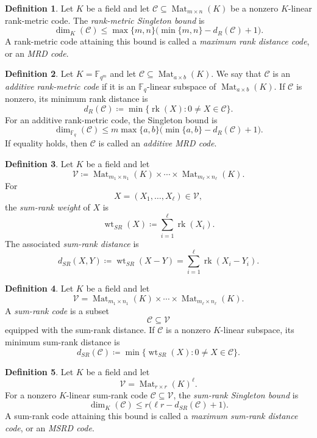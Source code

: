 \documentclass[10pt,a4paper]{amsart}
\DeclareMathOperator{\Mat}{Mat}
\DeclareMathOperator{\rk}{rk}
\DeclareMathOperator{\wt}{wt}
\theoremstyle{definition}
\newtheorem{definition}{Definition}[section]
\theoremstyle{plain}
\theoremstyle{remark}
\newcommand{\vF}{\mathbb F}
\begin{document}
\begin{definition}
Let $K$ be a field and let $\mathcal C\subseteq \Mat_{m\times n}(K)$ be a nonzero $K$-linear rank-metric code. The \emph{rank-metric Singleton bound} is
$$
\dim_K(\mathcal C)\leq \max\{m,n\}\bigl(\min\{m,n\}-d_R(\mathcal C)+1\bigr).
$$
A rank-metric code attaining this bound is called a \emph{maximum rank distance code}, or an \emph{MRD code}.
\end{definition}

\begin{definition}
Let $K=\vF_{q^m}$ and let $\mathcal C\subseteq \Mat_{a\times b}(K)$. We say that $\mathcal C$ is an \emph{additive rank-metric code} if it is an $\vF_q$-linear subspace of $\Mat_{a\times b}(K)$. If $\mathcal C$ is nonzero, its minimum rank distance is
$$
d_R(\mathcal C)
\coloneqq
\min\{\rk(X):0\neq X\in\mathcal C\}.
$$
For an additive rank-metric code, the Singleton bound is
$$
\dim_{\vF_q}(\mathcal C)
\leq
m\max\{a,b\}\bigl(\min\{a,b\}-d_R(\mathcal C)+1\bigr).
$$
If equality holds, then $\mathcal C$ is called an \emph{additive MRD code}.
\end{definition}

\begin{definition}
Let $K$ be a field and let
$$
\mathcal V
\coloneqq
\Mat_{m_1\times n_1}(K)\times\cdots\times \Mat_{m_\ell\times n_\ell}(K).
$$
For
$$
X=(X_1,\ldots,X_\ell)\in\mathcal V,
$$
the \emph{sum-rank weight} of $X$ is
$$
\wt_{SR}(X)\coloneqq \sum_{i=1}^{\ell}\rk(X_i).
$$
The associated \emph{sum-rank distance} is
$$
d_{SR}(X,Y)\coloneqq \wt_{SR}(X-Y)
=
\sum_{i=1}^{\ell}\rk(X_i-Y_i).
$$
\end{definition}

\begin{definition}
Let $K$ be a field and let
$$
\mathcal V
=
\Mat_{m_1\times n_1}(K)\times\cdots\times \Mat_{m_\ell\times n_\ell}(K).
$$
A \emph{sum-rank code} is a subset
$$
\mathcal C\subseteq \mathcal V
$$
equipped with the sum-rank distance. If $\mathcal C$ is a nonzero $K$-linear subspace, its minimum sum-rank distance is
$$
d_{SR}(\mathcal C)
\coloneqq
\min\{\wt_{SR}(X):0\neq X\in\mathcal C\}.
$$
\end{definition}

\begin{definition}
Let $K$ be a field and let
$$
\mathcal V=\Mat_{r\times r}(K)^\ell.
$$
For a nonzero $K$-linear sum-rank code $\mathcal C\subseteq\mathcal V$, the \emph{sum-rank Singleton bound} is
$$
\dim_K(\mathcal C)\leq r\bigl(\ell r-d_{SR}(\mathcal C)+1\bigr).
$$
A sum-rank code attaining this bound is called a \emph{maximum sum-rank distance code}, or an \emph{MSRD code}.
\end{definition}
\end{document}
